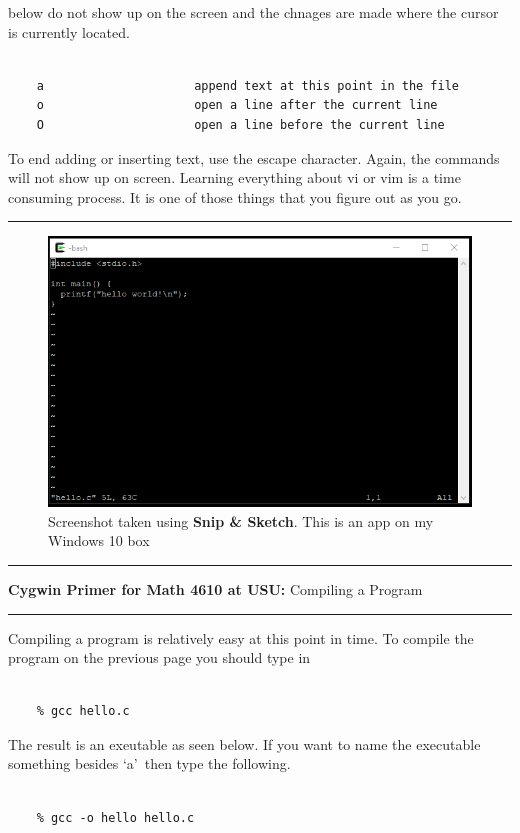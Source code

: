 \documentclass[10pt,fleqn]{article}
\begin{document}
below do not show up on the screen and the chnages are made where the cursor is
currently located.
\begin{verbatim}

    a                     append text at this point in the file
    o                     open a line after the current line
    O                     open a line before the current line

\end{verbatim}
To end adding or inserting text, use the escape character. Again, the commands
will not show up on screen. Learning everything about vi or vim is a time
consuming process. It is one of those things that you figure out as you go.
\vskip0.1in\hrule\vskip0.1in
\vfill
\begin{figure}[h]
\centering
\includegraphics{./images/cygwin_07.png}
\caption{{Screenshot} taken using {\bf Snip \& Sketch}. This is an app on
         my Windows 10 box}
\end{figure}
\eject
\vskip0.1in\hrule\vskip0.1in
\noindent
{{\bf Cygwin Primer for Math 4610 at USU:} Compiling a Program} 
\vskip0.1in\hrule\vskip0.1in
\noindent
Compiling a program is relatively easy at this point in time. To compile the
program on the previous page you should type in
\begin{verbatim}

    % gcc hello.c

\end{verbatim}
The result is an exeutable as seen below. If you want to name the executable
something besides \lq a\rq\ then type the following.
\begin{verbatim}

    % gcc -o hello hello.c

\end{verbatim}
\end{document}
